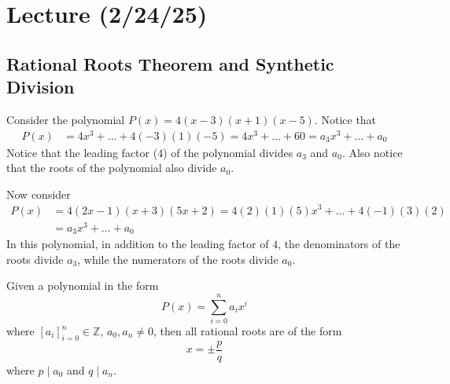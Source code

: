 \documentclass[notes]{subfiles}
\begin{document}
\setcounter{section}{10}
\section{Lecture (2/24/25)}
\subsection{Rational Roots Theorem and Synthetic Division}
Consider the polynomial $P(x) = 4(x - 3)(x + 1)(x - 5)$. Notice that
\begin{align*}
    P(x)
    &= 4x^3 + \ldots + 4(-3)(1)(-5)
    = 4x^3 + \ldots + 60
    = a_3x^3 + \ldots + a_0
\end{align*}
Notice that the leading factor ($4$) of the polynomial divides $a_3$ and $a_0$. Also notice that the roots of the polynomial also divide $a_0$.

Now consider
\begin{align*}
    P(x)
    &= 4(2x - 1)(x + 3)(5x + 2)
    = 4(2)(1)(5)x^3 + \ldots + 4(-1)(3)(2) \\
    &= a_3x^3 + \ldots + a_0
\end{align*}
In this polynomial, in addition to the leading factor of $4$, the denominators of the roots divide $a_3$, while the numerators of the roots divide $a_0$.

\begin{theorem} \label{rational_roots_theorem}
    Given a polynomial in the form
    \[
        P(x) = \sum_{i = 0}^n a_i x^i
    \]
    where $[a_i]_{i = 0}^n \in \mathbb{Z}$, $a_0, a_n \neq 0$, then all rational roots are of the form
    \[
        x = \pm \frac{p}{q}
    \]
    where $p \mid a_0$ and $q \mid a_n$.
\end{theorem}
\end{document}
